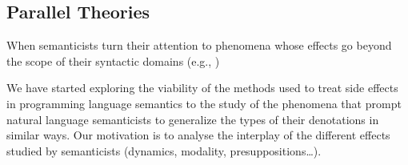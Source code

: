 \documentclass[a4paper,11pt]{article}
\begin{document}
\subsection{Parallel Theories}

When semanticists turn their attention to phenomena whose effects go beyond
the scope of their syntactic domains (e.g., )

We have started exploring the viability of the methods used to treat side
effects in programming language semantics to the study of the phenomena
that prompt natural language semanticists to generalize the types of their
denotations in similar ways. Our motivation is to analyse the interplay of
the different effects studied by semanticists (dynamics, modality,
presuppositions\ldots).




\end{document}
